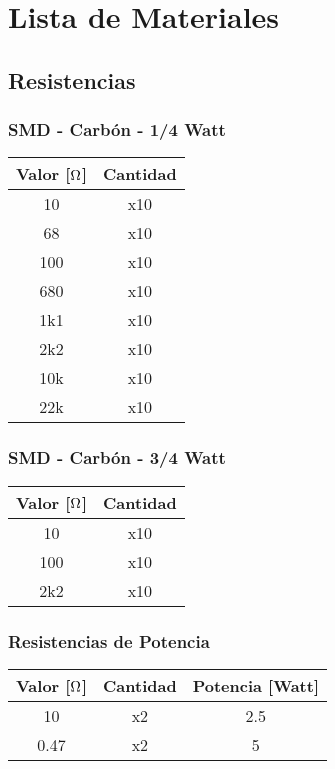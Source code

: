 \documentclass[a4paper,11pt]{article}
\begin{document}
\section{Lista de Materiales}
\subsection{Resistencias}
\subsubsection{SMD - Carbón - 1/4 Watt}

\begin{table}[h]
\centering
\begin{tabular}{|c|c|}
\hline
Valor [$\ohm$] & Cantidad\\
\hline
10   & x10   	\\
68   & x10   	\\
100  & x10    \\
680  & x10  	\\
1k1  & x10	\\
2k2  & x10	\\
10k  & x10	\\   
22k  & x10	\\     
 \hline
\end{tabular}
\end{table}

\subsubsection{SMD - Carbón - 3/4 Watt}

\begin{table}[h]
\centering
\begin{tabular}{|c|c|}
\hline
Valor [$\ohm$] & Cantidad\\
\hline
10   & x10   	\\

100  & x10    \\

2k2  & x10   	\\   
 \hline
\end{tabular}
\end{table}

\subsubsection{Resistencias de Potencia}

\begin{table}[h]
\centering
\begin{tabular}{|c|c|c|}
\hline
Valor [$\ohm$] & Cantidad & Potencia [Watt]\\
\hline
10   &  x2 & 2.5   	\\
0.47  & x2 & 5   	\\  
 \hline
\end{tabular}
\end{table}
\end{document}
